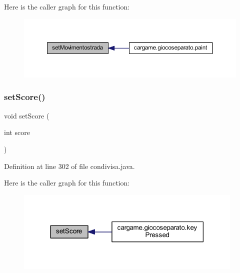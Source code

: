 Here is the caller graph for this function\+:
\nopagebreak
\begin{figure}[H]
\begin{center}
\leavevmode
\includegraphics[width=350pt]{classcargame_1_1condivisa_ac46fe43a46f5b9232c29e36c7e4a65d4_icgraph}
\end{center}
\end{figure}
\mbox{\label{classcargame_1_1condivisa_aa6293371e2d8c3a2c7f9f512d738d53b}} 
\subsubsection{\texorpdfstring{set\+Score()}{setScore()}}
{\footnotesize\ttfamily void set\+Score (\begin{DoxyParamCaption}\item[{int}]{score }\end{DoxyParamCaption})}



Definition at line 302 of file condivisa.\+java.

Here is the caller graph for this function\+:
\nopagebreak
\begin{figure}[H]
\begin{center}
\leavevmode
\includegraphics[width=309pt]{classcargame_1_1condivisa_aa6293371e2d8c3a2c7f9f512d738d53b_icgraph}
\end{center}
\end{figure}
\mbox{\label{classcargame_1_1condivisa_a3b320d14ab676975894c44bd3ed68fbe}} 

